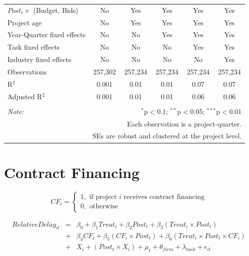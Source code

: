 \documentclass[
]{article}
\begin{document}
\begin{table}[H]
\begin{tabular}{@{\extracolsep{-2pt}}lccccc}
$Post_t \times$  (Budget, Bids) & No & Yes & Yes & Yes & Yes \\ 
Project age & No & Yes & Yes & Yes & Yes \\ 
Year-Quarter fixed effects & No & No & Yes & Yes & Yes \\ 
Task fixed effects & No & No & No & Yes & Yes \\ 
Industry fixed effects & No & No & No & No & Yes \\ 
Observations & 257,302 & 257,234 & 257,234 & 257,234 & 257,234 \\ 
R$^{2}$ & 0.001 & 0.01 & 0.01 & 0.07 & 0.07 \\ 
Adjusted R$^{2}$ & 0.001 & 0.01 & 0.01 & 0.06 & 0.06 \\ 
\hline 
\hline \\[-1.8ex] 
\textit{Note:}  & \multicolumn{5}{r}{$^{*}$p$<$0.1; $^{**}$p$<$0.05; $^{***}$p$<$0.01} \\ 
 & \multicolumn{5}{r}{Each observation is a project-quarter.} \\ 
 & \multicolumn{5}{r}{SEs are robust and clustered at the project level.} \\ 
\end{tabular} 
\end{table}

\hypertarget{contract-financing}{%
\section{Contract Financing}\label{contract-financing}}

\[ CF_i = \begin{cases} 1, \text{ if project } i \text{ receives contract financing}\\
0, \text{ otherwise} \end{cases}\]

\[ \begin{aligned}
RelativeDelay_{it} &=& \beta_0+\beta_1 Treat_i + \beta_2 Post_t + \beta_3 (Treat_i \times Post_t) \\
&+&\beta_4 CF_i + \beta_5 (CF_i \times Post_t) + \beta_6 (Treat_i \times Post_t \times CF_i) \\ 
&+&X_i + (Post_t \times X_i) + \mu_t + \theta_{firm} + \lambda_{task}+ \epsilon_{it}
\end{aligned}\]
\end{document}
